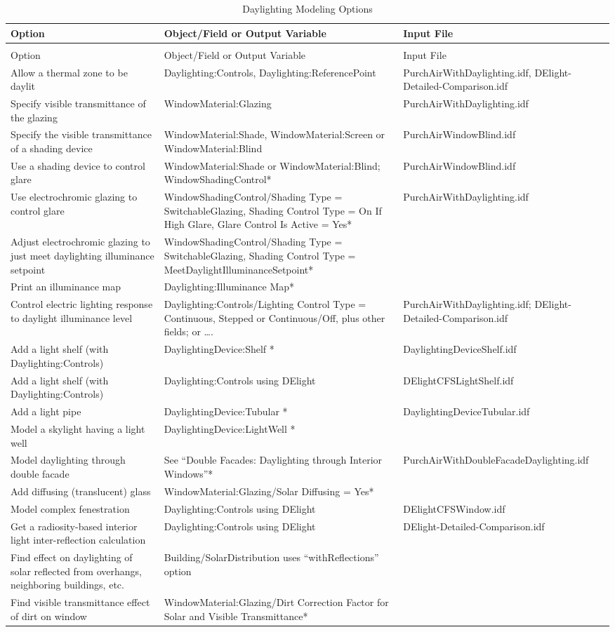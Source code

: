 {\scriptsize
\begin{longtable}[c]{>{\raggedright}p{1.5in}>{\raggedright}p{3.0in}>{\raggedright}p{1.5in}}
\caption{Daylighting Modeling Options \label{table:daylighting-modeling-options}} \tabularnewline
\toprule 
Option & Object/Field or Output Variable & Input File \tabularnewline
\midrule
\endfirsthead

\caption[]{Daylighting Modeling Options} \tabularnewline
\toprule 
Option & Object/Field or Output Variable & Input File \tabularnewline
\midrule
\endhead

Allow a thermal zone to be daylit & Daylighting:Controls, Daylighting:ReferencePoint & PurchAirWithDaylighting.idf, DElight-Detailed-Comparison.idf \tabularnewline
Specify visible transmittance of the glazing & WindowMaterial:Glazing & PurchAirWithDaylighting.idf \tabularnewline
Specify the visible transmittance of a shading device & WindowMaterial:Shade, WindowMaterial:Screen or WindowMaterial:Blind & PurchAirWindowBlind.idf \tabularnewline
Use a shading device to control glare & WindowMaterial:Shade or WindowMaterial:Blind; WindowShadingControl* & PurchAirWindowBlind.idf \tabularnewline
Use electrochromic glazing to control glare & WindowShadingControl/Shading Type = SwitchableGlazing, Shading Control Type = On If High Glare, Glare Control Is Active = Yes* & PurchAirWithDaylighting.idf \tabularnewline
Adjust electrochromic glazing to just meet daylighting illuminance setpoint & WindowShadingControl/Shading Type = SwitchableGlazing, Shading Control Type = MeetDaylightIlluminanceSetpoint* & ~ \tabularnewline
Print an illuminance map & Daylighting:Illuminance Map* & ~ \tabularnewline
Control electric lighting response to daylight illuminance level & Daylighting:Controls/Lighting Control Type = Continuous, Stepped or Continuous/Off, plus other fields; or …. & PurchAirWithDaylighting.idf; DElight-Detailed-Comparison.idf \tabularnewline
Add a light shelf (with Daylighting:Controls) & DaylightingDevice:Shelf * & DaylightingDeviceShelf.idf \tabularnewline
Add a light shelf (with Daylighting:Controls) & Daylighting:Controls using DElight & DElightCFSLightShelf.idf \tabularnewline
Add a light pipe & DaylightingDevice:Tubular * & DaylightingDeviceTubular.idf \tabularnewline
Model a skylight having a light well & DaylightingDevice:LightWell * & ~ \tabularnewline
Model daylighting through double facade & See “Double Facades: Daylighting through Interior Windows”* & PurchAirWithDoubleFacadeDaylighting.idf \tabularnewline
Add diffusing (translucent) glass & WindowMaterial:Glazing/Solar Diffusing = Yes* & ~ \tabularnewline
Model complex fenestration & Daylighting:Controls using DElight & DElightCFSWindow.idf \tabularnewline
Get a radiosity-based interior light inter-reflection calculation & Daylighting:Controls using DElight & DElight-Detailed-Comparison.idf \tabularnewline
Find effect on daylighting of solar reflected from overhangs, neighboring buildings, etc. & Building/SolarDistribution uses “withReflections” option & ~ \tabularnewline
Find visible transmittance effect of dirt on window & WindowMaterial:Glazing/Dirt Correction Factor for Solar and Visible Transmittance* & ~ \tabularnewline
\bottomrule
\end{longtable}}

